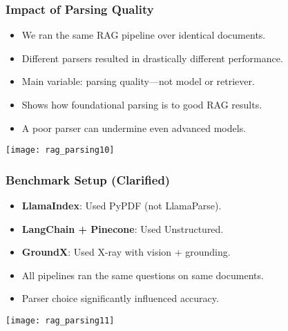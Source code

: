 \begin{frame}[fragile]\frametitle{Impact of Parsing Quality}
  \begin{itemize}
    \item We ran the same RAG pipeline over identical documents.
    \item Different parsers resulted in drastically different performance.
    \item Main variable: parsing quality—not model or retriever.
    \item Shows how foundational parsing is to good RAG results.
    \item A poor parser can undermine even advanced models.
  \end{itemize}
  
    \begin{center}
      \texttt{[image: rag\_parsing10]}
    \end{center}   
\end{frame}

\begin{frame}[fragile]\frametitle{Benchmark Setup (Clarified)}
  \begin{itemize}
    \item \textbf{LlamaIndex}: Used PyPDF (not LlamaParse).
    \item \textbf{LangChain + Pinecone}: Used Unstructured.
    \item \textbf{GroundX}: Used X-ray with vision + grounding.
    \item All pipelines ran the same questions on same documents.
    \item Parser choice significantly influenced accuracy.
  \end{itemize}
  
    \begin{center}
      \texttt{[image: rag\_parsing11]}
    \end{center}    
\end{frame}


